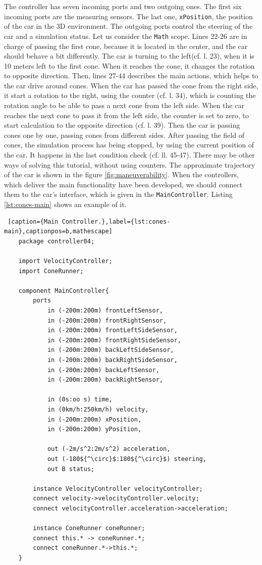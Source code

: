 The controller has seven incoming ports and two outgoing ones. The first six incoming ports are the measuring sensors. The last one, \texttt{xPosition}, the position of the car in the 3D environment. The outgoing ports control the steering of the car and a simulation status. Let us consider the \texttt{Math} scope. Lines 22-26 are in charge of passing the first cone, because it is located in the center, and the car should behave a bit differently. The car is turning to the left(cf. l. 23), when it is 10 meters left to the first cone. When it reaches the cone, it changes the rotation to opposite direction. Then, lines 27-44 describes the main actions, which helps to the car drive around cones. When the car has passed the cone from the right side, it start a rotation to the right, using the counter (cf. l. 34), which is counting the rotation angle to be able to pass a next cone from the left side. When the car reaches the next cone to pass it from the left side, the counter is set to zero, to start calculation to the opposite direction (cf. l. 39). Then the car is passing cones one by one, passing cones from different sides. After passing the field of cones, the simulation process has being stopped, by using the current position of the car. It happens in the last condition check (cf. ll. 45-47). There may be other ways of solving this tutorial, without using counters. The approximate trajectory of the car is shown in the figure \ref{fig:maneuverability}. When the controllers, which deliver the main functionality have been developed, we should connect them to the car's interface, which is given in the \texttt{MainController}. Listing \ref{lst:cones-main} shows an example of it.
\bigskip
\begin{lstlisting} [caption={Main Controller.},label={lst:cones-main},captionpos=b,mathescape]
    package controller04;

    import VelocityController;
    import ConeRunner;
    
    component MainController{
        ports 
            in (-200m:200m) frontLeftSensor,
            in (-200m:200m) frontRightSensor,
            in (-200m:200m) frontLeftSideSensor,
            in (-200m:200m) frontRightSideSensor,
            in (-200m:200m) backLeftSideSensor,
            in (-200m:200m) backRightSideSensor,
            in (-200m:200m) backLeftSensor,
            in (-200m:200m) backRightSensor,
    
            in (0s:oo s) time,
            in (0km/h:250km/h) velocity,
            in (-200m:200m) xPosition,
            in (-200m:200m) yPosition,
            
            out (-2m/s^2:2m/s^2) acceleration,
            out (-180${^\circ}$:180${^\circ}$) steering,
            out B status;
    
        instance VelocityController velocityController;
        connect velocity->velocityController.velocity;
        connect velocityController.acceleration->acceleration;
    
        instance ConeRunner coneRunner;
        connect this.* -> coneRunner.*;
        connect coneRunner.*->this.*; 
    }
\end{lstlisting}
